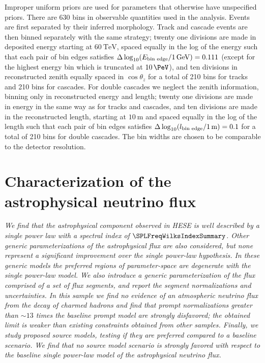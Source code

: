 Improper uniform priors are used for parameters that otherwise have unspecified priors.
There are $630$ bins in observable quantities used in the analysis.
Events are first separated by their inferred morphology.
Track and cascade events are then binned separately with the same strategy; twenty one divisions are made in deposited energy starting at $\SI{60}\TeV$, spaced equally in the log of the energy such that each pair of bin edges satisfies $\Delta\log_{10} ( E_\textmd{bin edge} / \SI{1}\GeV)=0.111$ (except for the highest energy bin which is truncated at $\SI{10}\PeV$), and ten divisions in reconstructed zenith equally spaced in $\cos\theta_z$ for a total of 210 bins for tracks and 210 bins for cascades.
For double cascades we neglect the zenith information, binning only in reconstructed energy and length; twenty one divisions are made in energy in the same way as for tracks and cascades, and ten divisions are made in the reconstructed length, starting at $\SI{10}\meter$ and spaced equally in the log of the length such that each pair of bin edges satisfies $\Delta\log_{10} (l_\textmd{bin edge} / \SI{1}\meter)=0.1$ for a total of 210 bins for double cascades.
The bin widths are chosen to be comparable to the detector resolution.

\section{Characterization of the astrophysical neutrino flux\label{sec:diffuse}}

\noindent
\textit{We find that the astrophysical component observed in HESE is well described by a single power law with a spectral index of $\SPLFreqWilksIndexSummary$.
	Other generic parameterizations of the astrophysical flux are also considered, but none represent a significant improvement over the single power-law hypothesis.
	In these generic models the preferred regions of parameter-space are degenerate with the single power-law model.
	We also introduce a generic parameterization of the flux comprised of a set of flux segments, and report the segment normalizations and uncertainties.
	In this sample we find no evidence of an atmospheric neutrino flux from the decay of charmed hadrons and find that prompt normalizations greater than $\sim 13$ times the baseline prompt model are strongly disfavored; the obtained limit is weaker than existing constraints obtained from other samples.
	Finally, we study proposed source models, testing if they are preferred compared to a baseline scenario.
	We find that no source model scenario is strongly favored with respect to the baseline single power-law model of the astrophysical neutrino flux.
}
\newline

